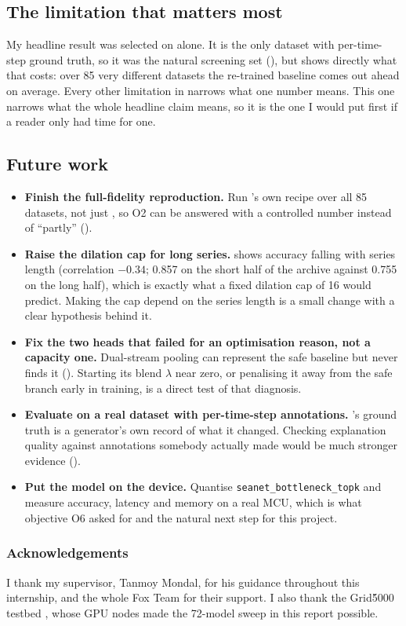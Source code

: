 \subsection*{The limitation that matters most}

My headline result was selected on \webtraffic{} alone. It is the only dataset with per-time-step
ground truth, so it was the natural screening set (), but 
shows directly what that costs: over 85 very different \ucr{} datasets the re-trained baseline comes
out ahead on average. Every other limitation in  narrows what one number
means. This one narrows what the whole headline claim means, so it is the one I would put first if a
reader only had time for one.

\subsection*{Future work}

\begin{itemize}\itemsep4pt
  \item \textbf{Finish the full-fidelity \millet{} reproduction.} Run \millet{}'s own recipe over
        all 85 datasets, not just \webtraffic{}, so O2 can be answered with a controlled number
        instead of ``partly'' ().
  \item \textbf{Raise the dilation cap for long series.}  shows accuracy falling
        with series length (correlation $-0.34$; 0.857 on the short half of the archive against
        0.755 on the long half), which is exactly what a fixed dilation cap of 16 would predict.
        Making the cap depend on the series length is a small change with a clear hypothesis behind
        it.
  \item \textbf{Fix the two heads that failed for an optimisation reason, not a capacity one.}
        Dual-stream pooling can represent the safe baseline but never finds it
        (). Starting its blend $\lambda$ near zero, or penalising it away
        from the safe branch early in training, is a direct test of that diagnosis.
  \item \textbf{Evaluate on a real dataset with per-time-step annotations.} \webtraffic{}'s ground
        truth is a generator's own record of what it changed. Checking explanation quality against
        annotations somebody actually made would be much stronger evidence
        ().
  \item \textbf{Put the model on the device.} Quantise \texttt{seanet\_bottleneck\_topk} and measure
        accuracy, latency and memory on a real MCU, which is what objective O6 asked for and the
        natural next step for this project.
\end{itemize}

\subsubsection*{Acknowledgements}



I thank my supervisor, Tanmoy Mondal, for his guidance throughout this internship, and the whole Fox Team for their support. I also thank the Grid\' 5000 testbed \citep{balouek2013grid5000}, whose GPU nodes made the 72-model sweep in this report possible.
